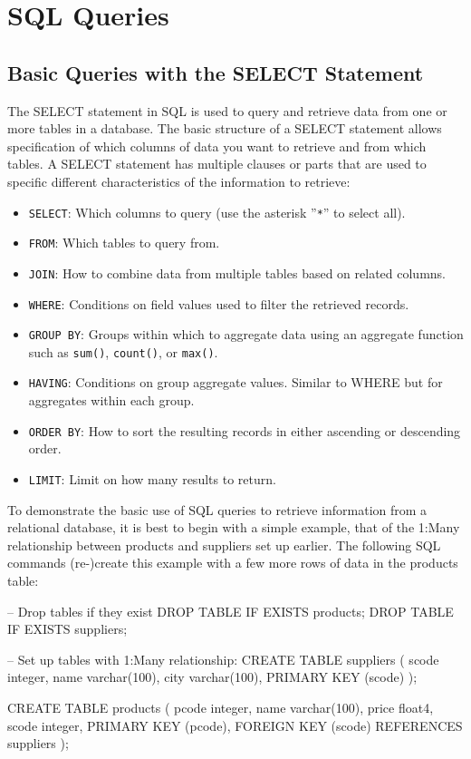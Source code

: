 \section{SQL Queries}

\subsection*{Basic Queries with the SELECT Statement}

The SELECT statement in SQL is used to query and retrieve data from one or more tables in a database. The basic structure of a SELECT statement allows specification of which columns of data you want to retrieve and from which tables. A SELECT statement has multiple clauses or parts that are used to specific different characteristics of the information to retrieve:

\begin{itemize}
 \item \texttt{SELECT}: Which columns to query (use the asterisk ''\texttt{*}'' to select all).
 \item \texttt{FROM}: Which tables to query from.
 \item \texttt{JOIN}: How to combine data from multiple tables based on related columns.
 \item \texttt{WHERE}: Conditions on field values used to filter the retrieved records.
 \item \texttt{GROUP BY}: Groups within which to aggregate data using an aggregate function such as \texttt{sum()}, \texttt{count()}, or \texttt{max()}.
 \item \texttt{HAVING}: Conditions on group aggregate values. Similar to WHERE but for aggregates within each group.
 \item \texttt{ORDER BY}: How to sort the resulting records in either ascending or descending order.
 \item \texttt{LIMIT}: Limit on how many results to return.
\end{itemize}

To demonstrate the basic use of SQL queries to retrieve information from a relational database, it is best to begin with a simple example, that of the 1:Many relationship between products and suppliers set up earlier. The following SQL commands (re-)create this example with a few more rows of data in the products table:

\begin{sqlcode}
-- Drop tables if they exist
DROP TABLE IF EXISTS products;
DROP TABLE IF EXISTS suppliers;

-- Set up tables with 1:Many relationship:
CREATE TABLE suppliers (
scode integer,
name varchar(100),
city varchar(100),
PRIMARY KEY (scode) );

CREATE TABLE products (
pcode	integer,
name	varchar(100),
price	float4,
scode   integer,
PRIMARY KEY (pcode),
FOREIGN KEY (scode) REFERENCES suppliers );
\end{sqlcode}

